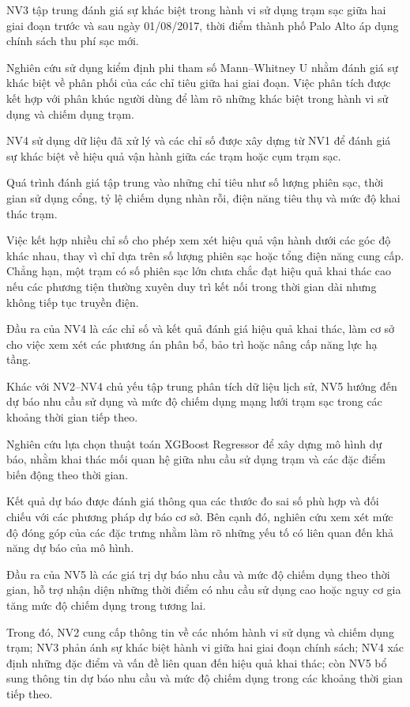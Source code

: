 \documentclass[conference,a4paper]{IEEEtran}
\begin{document}
NV3 tập trung đánh giá sự khác biệt trong hành vi sử dụng trạm sạc giữa hai giai đoạn trước và sau ngày 01/08/2017, thời điểm thành phố Palo Alto áp dụng chính sách thu phí sạc mới.

Nghiên cứu sử dụng kiểm định phi tham số Mann–Whitney U nhằm đánh giá sự khác biệt về phân phối của các chỉ tiêu giữa hai giai đoạn. Việc phân tích được kết hợp với phân khúc người dùng để làm rõ những khác biệt trong hành vi sử dụng và chiếm dụng trạm.

NV4 sử dụng dữ liệu đã xử lý và các chỉ số được xây dựng từ NV1 để đánh giá sự khác biệt về hiệu quả vận hành giữa các trạm hoặc cụm trạm sạc.

Quá trình đánh giá tập trung vào những chỉ tiêu như số lượng phiên sạc, thời gian sử dụng cổng, tỷ lệ chiếm dụng nhàn rỗi, điện năng tiêu thụ và mức độ khai thác trạm.

Việc kết hợp nhiều chỉ số cho phép xem xét hiệu quả vận hành dưới các góc độ khác nhau, thay vì chỉ dựa trên số lượng phiên sạc hoặc tổng điện năng cung cấp. Chẳng hạn, một trạm có số phiên sạc lớn chưa chắc đạt hiệu quả khai thác cao nếu các phương tiện thường xuyên duy trì kết nối trong thời gian dài nhưng không tiếp tục truyền điện.

Đầu ra của NV4 là các chỉ số và kết quả đánh giá hiệu quả khai thác, làm cơ sở cho việc xem xét các phương án phân bổ, bảo trì hoặc nâng cấp năng lực hạ tầng.

Khác với NV2–NV4 chủ yếu tập trung phân tích dữ liệu lịch sử, NV5 hướng đến dự báo nhu cầu sử dụng và mức độ chiếm dụng mạng lưới trạm sạc trong các khoảng thời gian tiếp theo.

Nghiên cứu lựa chọn thuật toán XGBoost Regressor để xây dựng mô hình dự báo, nhằm khai thác mối quan hệ giữa nhu cầu sử dụng trạm và các đặc điểm biến động theo thời gian.

Kết quả dự báo được đánh giá thông qua các thước đo sai số phù hợp và đối chiếu với các phương pháp dự báo cơ sở. Bên cạnh đó, nghiên cứu xem xét mức độ đóng góp của các đặc trưng nhằm làm rõ những yếu tố có liên quan đến khả năng dự báo của mô hình.

Đầu ra của NV5 là các giá trị dự báo nhu cầu và mức độ chiếm dụng theo thời gian, hỗ trợ nhận diện những thời điểm có nhu cầu sử dụng cao hoặc nguy cơ gia tăng mức độ chiếm dụng trong tương lai.

Trong đó, NV2 cung cấp thông tin về các nhóm hành vi sử dụng và chiếm dụng trạm; NV3 phản ánh sự khác biệt hành vi giữa hai giai đoạn chính sách; NV4 xác định những đặc điểm và vấn đề liên quan đến hiệu quả khai thác; còn NV5 bổ sung thông tin dự báo nhu cầu và mức độ chiếm dụng trong các khoảng thời gian tiếp theo.
\end{document}
